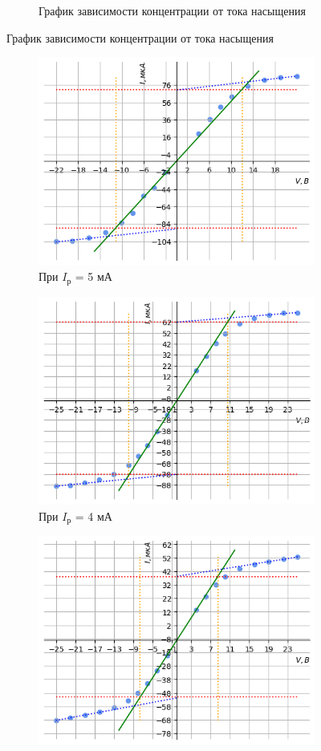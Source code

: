 \begin{figure}[h!]
\begin{subfigure}{0.5\linewidth}
        \caption{График зависимости концентрации от тока насыщения}
    \end{subfigure}
\end{figure}

\newpage
\begin{figure}[h!]
    \begin{subfigure}{0.5\linewidth}
        \centering
        \includegraphics[width=10cm]{images/plotI_5.png}
        \caption{При $I_{\text{р}}$ = 5 мА}
    \end{subfigure}
    \hfill
    \begin{subfigure}{0.5\linewidth}
        \centering
        \includegraphics[width=10cm]{images/plotI_4.png}
        \caption{При $I_{\text{р}}$ = 4 мА}
    \end{subfigure}
    \vfill
    \begin{subfigure}{0.5\linewidth}
        \centering
        \includegraphics[width=10cm]{images/plotI_3.png}

\end{subfigure}
\end{figure}
